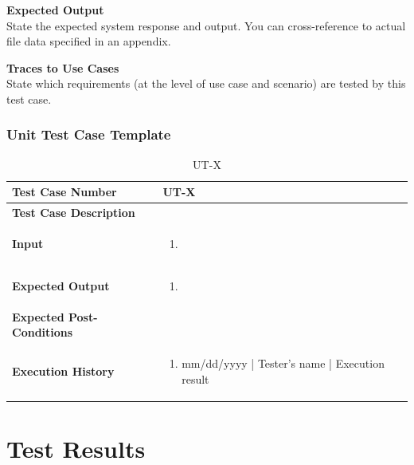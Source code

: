 \documentclass[12pt]{article}
\begin{document}
\noindent
{\bf Expected Output}\\
State the expected system response and output.
You can cross-reference to actual file data specified in an appendix.

\noindent
{\bf Traces to Use Cases}\\
State which requirements (at the level of use case and scenario) are tested by this test case.

\subsubsection{Unit Test Case Template}
\def\arraystretch{1.5}%
\begin{table}[htbp]
\centering
\caption{UT-X}
\label{UT-X}
\begin{tabularx}{\textwidth}{ | l | X |}
\hline
\textbf{Test Case Number}      		&  UT-X                   			\\ \hline
\textbf{Test Case Description}    	&                  				\\ \hline
\textbf{Input}         			& 	\begin{enumerate}
								\item
							\end{enumerate} 		\\ \hline
\textbf{Expected Output}     		& 	\begin{enumerate}
								\item 
							\end{enumerate} 		\\ \hline
\textbf{Expected Post-Conditions}	&                 				\\ \hline
\textbf{Execution History}   		&  	\begin{enumerate}
								\item mm/dd/yyyy | Tester's name | Execution result
							\end {enumerate} \\ \hline
\end{tabularx}
\end{table}
\clearpage

\section{Test Results}
\end{document}

